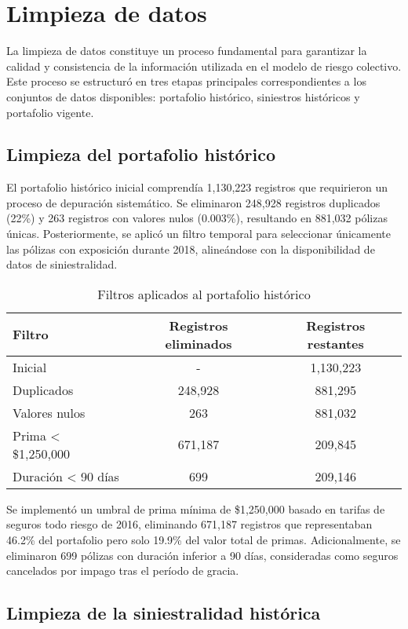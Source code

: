 \section{Limpieza de datos}

La limpieza de datos constituye un proceso fundamental para garantizar la calidad y consistencia de la información utilizada en el modelo de riesgo colectivo. Este proceso se estructuró en tres etapas principales correspondientes a los conjuntos de datos disponibles: portafolio histórico, siniestros históricos y portafolio vigente.

\subsection{Limpieza del portafolio histórico}

El portafolio histórico inicial comprendía 1,130,223 registros que requirieron un proceso de depuración sistemático. Se eliminaron 248,928 registros duplicados (22\%) y 263 registros con valores nulos (0.003\%), resultando en 881,032 pólizas únicas. Posteriormente, se aplicó un filtro temporal para seleccionar únicamente las pólizas con exposición durante 2018, alineándose con la disponibilidad de datos de siniestralidad.

\begin{table}[H]
\centering
\caption{Filtros aplicados al portafolio histórico}
\begin{tabular}{lcc}
\hline
\textbf{Filtro} & \textbf{Registros eliminados} & \textbf{Registros restantes} \\
\hline
Inicial & - & 1,130,223 \\
Duplicados & 248,928 & 881,295 \\
Valores nulos & 263 & 881,032 \\
Prima < \$1,250,000 & 671,187 & 209,845 \\
Duración < 90 días & 699 & 209,146 \\
\hline
\end{tabular}
\end{table}

Se implementó un umbral de prima mínima de \$1,250,000 basado en tarifas de seguros todo riesgo de 2016, eliminando 671,187 registros que representaban 46.2\% del portafolio pero solo 19.9\% del valor total de primas. Adicionalmente, se eliminaron 699 pólizas con duración inferior a 90 días, consideradas como seguros cancelados por impago tras el período de gracia.

\subsection{Limpieza de la siniestralidad histórica}

